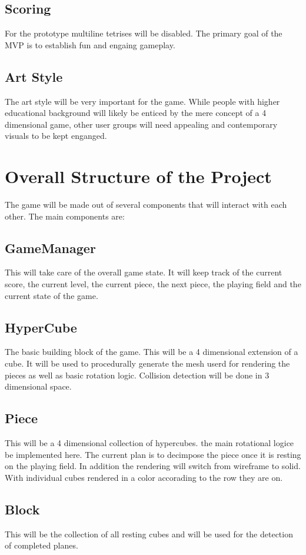 \documentclass{article}
\begin{document}
\subsection{Scoring}
For the prototype multiline tetrises will be disabled. The primary goal of the MVP is to establish fun and engaing gameplay.
\subsection{Art Style}
The art style will be very important for the game. While people with higher educational background will likely be enticed by the mere concept of a 4 dimensional game, other user groups will need appealing and contemporary visuals to be kept enganged.



\section{Overall Structure of the Project}
The game will be made out of several components that will interact with each other. The main components are:
\subsection{GameManager}
This will take care of the overall game state. It will keep track of the current score, the current level, the current piece, the next piece, the playing field and the current state of the game. 
\subsection{HyperCube}
The basic building block of the game. This will be a 4 dimensional extension of a cube. It will be used to procedurally generate the mesh userd for rendering the pieces as well as basic rotation logic. Collision detection will be done in 3 dimensional space.
\subsection{Piece}
This will be a 4 dimensional collection of hypercubes. the main rotational logice be implemented here. The current plan is to decimpose the piece once it is resting on the playing field. In addition the rendering will switch from wireframe to solid. With individual cubes rendered in a color accorading to the row they are on.
\subsection{Block}
This will be the collection of all resting cubes and will be used for the detection of completed planes.
\end{document}
